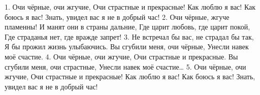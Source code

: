 ﻿1.
Очи чёрные, очи жгучие,
Очи страстные и прекрасные!
Как люблю я вас! Как боюсь я вас!
Знать, увидел вас я не в добрый час!
2.
Очи чёрные, жгуче пламенны!
И манят они в страны дальние,
Где царит любовь, где царит покой,
Где страданья нет, где вражде запрет!
3.
Не встречал бы вас, не страдал бы так,
Я бы прожил жизнь улыбаючись.
Вы сгубили меня, очи чёрные,
Унесли навек моё счастие.
4.
Очи чёрные, очи жгучие,
Очи страстные и прекрасные.
Вы сгубили меня, очи страстные,
Унесли навек моё счастие…
5.
Очи чёрные, очи жгучие,
Очи страстные и прекрасные!
Как люблю я вас! Как боюсь я вас!
Знать, увидел вас я не в добрый час!

